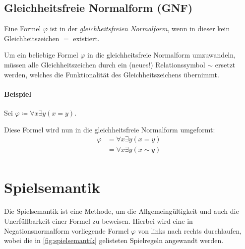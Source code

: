 \documentclass[a4paper, 11pt, accentcolor = tud3b]{tudreport}
\begin{document}
            \subsection{Gleichheitsfreie Normalform (GNF)}
                Eine Formel $ \varphi $ ist in der \textit{gleichheitsfreien Normalform}, wenn in dieser kein Gleichheitszeichen $ = $ existiert.

                Um ein beliebige Formel $ \varphi $ in die gleichheitsfreie Normalform umzuwandeln, müssen alle Gleichheitszeichen durch ein (neues!) Relationssymbol $ \sim $ ersetzt werden, welches die Funktionalität des Gleichheitszeichens übernimmt.

                \paragraph{Beispiel}
                    Sei $ \varphi \coloneqq \forall x \exists y (x = y) $.

                    Diese Formel wird nun in die gleichheitsfreie Normalform umgeformt:
                    \begin{align*}
                        \varphi &= \forall x \exists y (x = y) \tag{Substitution} \\
                                &= \forall x \exists y (x \sim y) \tag{Gleichheitsfreie Normalform} \\
                    \end{align*}

        \section{Spielsemantik}
            Die Spielsemantik ist eine Methode, um die Allgemeingültigkeit und auch die Unerfüllbarkeit einer Formel zu beweisen. Hierbei wird eine in Negationsnormalform vorliegende Formel $ \varphi $ von links nach rechts durchlaufen, wobei die in \ref{fig:spielsemantik} gelisteten Spielregeln angewandt werden.
\end{document}
